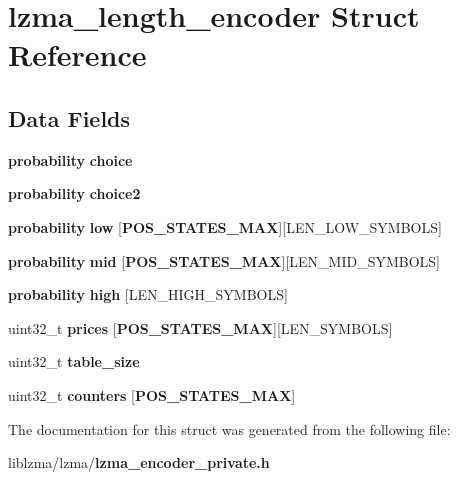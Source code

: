 \section{lzma\-\_\-length\-\_\-encoder Struct Reference}
\label{structlzma__length__encoder}
\subsection*{Data Fields}
\begin{DoxyCompactItemize}
\item 
{\bf probability} {\bfseries choice}\label{structlzma__length__encoder_add23b6aade7f924329286d12f986ca1e}

\item 
{\bf probability} {\bfseries choice2}\label{structlzma__length__encoder_ab3206c84782acc002aacc00291483c4d}

\item 
{\bf probability} {\bfseries low} [{\bf P\-O\-S\-\_\-\-S\-T\-A\-T\-E\-S\-\_\-\-M\-A\-X}][L\-E\-N\-\_\-\-L\-O\-W\-\_\-\-S\-Y\-M\-B\-O\-L\-S]\label{structlzma__length__encoder_a55fd25066543d993628c5fcbe61f33a4}

\item 
{\bf probability} {\bfseries mid} [{\bf P\-O\-S\-\_\-\-S\-T\-A\-T\-E\-S\-\_\-\-M\-A\-X}][L\-E\-N\-\_\-\-M\-I\-D\-\_\-\-S\-Y\-M\-B\-O\-L\-S]\label{structlzma__length__encoder_aafe93b2fdb31ac9173f7059d84bd8ef4}

\item 
{\bf probability} {\bfseries high} [L\-E\-N\-\_\-\-H\-I\-G\-H\-\_\-\-S\-Y\-M\-B\-O\-L\-S]\label{structlzma__length__encoder_a53d29418c873017528f931a42b20eeb0}

\item 
uint32\-\_\-t {\bfseries prices} [{\bf P\-O\-S\-\_\-\-S\-T\-A\-T\-E\-S\-\_\-\-M\-A\-X}][L\-E\-N\-\_\-\-S\-Y\-M\-B\-O\-L\-S]\label{structlzma__length__encoder_af9ee57976244e8392426369ae8b9133d}

\item 
uint32\-\_\-t {\bfseries table\-\_\-size}\label{structlzma__length__encoder_a381e1edd41f2a0433d8f50eb230cb88d}

\item 
uint32\-\_\-t {\bfseries counters} [{\bf P\-O\-S\-\_\-\-S\-T\-A\-T\-E\-S\-\_\-\-M\-A\-X}]\label{structlzma__length__encoder_a9dfa0dc80c7b50d579a6dd6d3b076642}

\end{DoxyCompactItemize}


The documentation for this struct was generated from the following file\-:\begin{DoxyCompactItemize}
\item 
liblzma/lzma/{\bf lzma\-\_\-encoder\-\_\-private.\-h}\end{DoxyCompactItemize}
